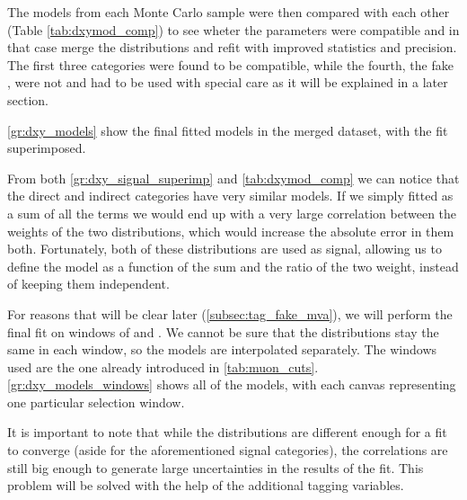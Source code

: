 
The models from each Monte Carlo sample were then compared with each other (Table \ref{tab:dxymod_comp}) to see wheter the parameters were compatible and in that case merge the distributions and refit with improved statistics and precision.
The first three categories were found to be compatible, while the fourth, the fake \Pgm, were not and had to be used with special care as it will be explained in a later section.

\autoref{gr:dxy_models} show the final fitted models in the merged dataset, with the fit superimposed.



From both \autoref{gr:dxy_signal_superimp} and \autoref{tab:dxymod_comp} we can notice that the direct and indirect \Pgm categories have very similar models. 
If we simply fitted as a sum of all the terms we would end up with a very large correlation between the weights of the two distributions, which would increase the absolute error in them both. 
Fortunately, both of these distributions are used as signal, allowing us to define the model as a function of the sum and the ratio of the two weight, instead of keeping them independent.

For reasons that will be clear later (\autoref{subsec:tag_fake_mva}), we will perform the final fit on windows of \pt and \psrap.
We cannot be sure that the distributions stay the same in each window, so the models are interpolated separately.
The windows used are the one already introduced in \autoref{tab:muon_cuts}.
\autoref{gr:dxy_models_windows} shows all of the models, with each canvas representing one particular selection window.



It is important to note that while the distributions are different enough for a fit to converge (aside for the aforementioned signal categories), the correlations are still big enough to generate large uncertainties in the results of the fit.
This problem will be solved with the help of the additional tagging variables.
